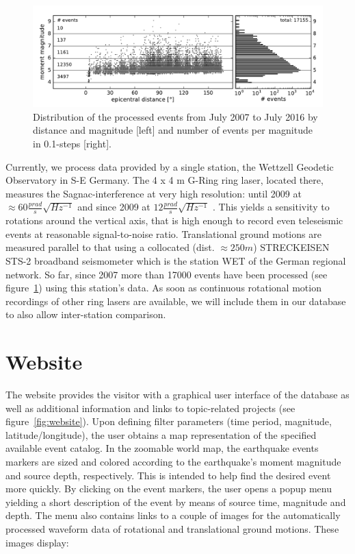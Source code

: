 \documentclass[12pt,reqno,letter]{article} %
\begin{document}
\noindent
\begin{figure}[htp!]
	\includegraphics[width=\textwidth]{dist_mag_merged.pdf}
	\caption{Distribution of the processed events from July 2007 to July 2016 by distance and magnitude [left] and number of events per magnitude in 0.1-steps [right].}
	\label{fig:mag_dist}
\end{figure}
Currently, we process data provided by a single station, the Wettzell Geodetic Observatory in S-E Germany. The 4 x 4 m G-Ring ring laser, located there, measures the Sagnac-interference at very high resolution: until 2009 at $\approx60\frac{prad}{s}\sqrt{Hz^{-1}}$ and since 2009 at $12\frac{prad}{s}\sqrt{Hz^{-1}}$ \citep{Schreiber2013}. This yields a sensitivity to rotations around the vertical axis, that is high enough to record even teleseismic events at reasonable signal-to-noise ratio.
Translational ground motions are measured parallel to that using a collocated (dist. $\approx250m$) STRECKEISEN STS-2 broadband seismometer which is the station WET of the German regional network. So far, since 2007 more than 17000 events have been processed (see figure~\ref{fig:mag_dist}) using this station's data. As soon as continuous rotational motion recordings of other ring lasers are available, we will include them in our database to also allow inter-station comparison.\\
% 
% 
\section{Website}
\label{sec:website}

The website provides the visitor with a graphical user interface of the database as well as additional information and links to topic-related projects (see figure~\ref{fig:website}).
Upon defining filter parameters (time period, magnitude, latitude/longitude), the user obtains a map representation of the specified available event catalog. In the zoomable world map, the earthquake events markers are sized and colored according to the earthquake’s moment magnitude and source depth, respectively. This is intended to help find the desired event more quickly.
By clicking on the event markers, the user opens a popup menu yielding a short description of the event by means of source time, magnitude and depth. The menu also contains links to a couple of images for the automatically processed waveform data of rotational and translational ground motions. These images display:
\end{document}

